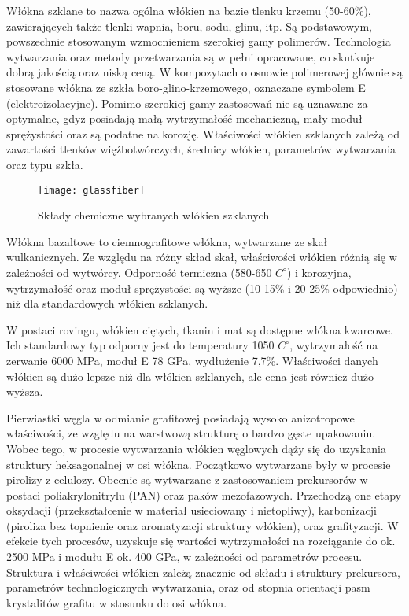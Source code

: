 \documentclass[magister,druk]{dyplom}
\begin{document}
Włókna szklane to nazwa ogólna włókien na bazie tlenku krzemu (50-60\%), zawierających także tlenki wapnia, boru, sodu, glinu, itp. Są podstawowym, powszechnie stosowanym wzmocnieniem szerokiej gamy polimerów. Technologia wytwarzania oraz metody przetwarzania są w pełni opracowane, co skutkuje dobrą jakością oraz niską ceną. W kompozytach o osnowie polimerowej głównie są stosowane włókna ze szkła boro-glino-krzemowego, oznaczane symbolem E (elektroizolacyjne). Pomimo szerokiej gamy zastosowań nie są uznawane za optymalne, gdyż posiadają małą wytrzymałość mechaniczną, mały moduł sprężystości oraz są podatne na korozję. Właściwości włókien szklanych zależą od zawartości tlenków więźbotwórczych, średnicy włókien, parametrów wytwarzania oraz typu szkła.

\begin{figure}[]
	\centering
	\texttt{[image: glassfiber]}
	\caption{Składy chemiczne wybranych włókien szklanych\cite{Chawla1998}}
\end{figure}

Włókna bazaltowe to ciemnografitowe włókna, wytwarzane ze skał wulkanicznych. Ze względu na różny skład skał, właściwości włókien różnią się w zależności od wytwórcy. Odporność termiczna (580-650 ${C^{\circ}}$) i korozyjna, wytrzymałość oraz moduł sprężystości są wyższe (10-15\% i 20-25\% odpowiednio) niż dla standardowych włókien szklanych.

W postaci rovingu, włókien ciętych, tkanin i mat są dostępne włókna kwarcowe. Ich standardowy typ odporny jest do temperatury 1050 ${C^{\circ}}$, wytrzymałość na zerwanie 6000 MPa, moduł E 78 GPa, wydłużenie 7,7\%. Właściwości danych włókien są dużo lepsze niż dla włókien szklanych, ale cena jest również dużo wyższa.

Pierwiastki węgla w odmianie grafitowej posiadają wysoko anizotropowe właściwości, ze względu na warstwową strukturę o bardzo gęste upakowaniu. Wobec tego, w procesie wytwarzania włókien węglowych dąży się do uzyskania struktury heksagonalnej w osi włókna. Początkowo wytwarzane były w procesie pirolizy z celulozy. Obecnie są wytwarzane z zastosowaniem prekursorów w postaci poliakrylonitrylu (PAN) oraz paków mezofazowych. Przechodzą one etapy oksydacji (przekształcenie w materiał usieciowany i nietopliwy), karbonizacji (piroliza bez topnienie oraz aromatyzacji struktury włókien), oraz grafityzacji. W efekcie tych procesów, uzyskuje się wartości wytrzymałości na rozciąganie do ok. 2500 MPa i modułu E ok. 400 GPa, w zależności od parametrów procesu. Struktura i właściwości włókien zależą znacznie od składu i struktury prekursora, parametrów technologicznych wytwarzania, oraz od stopnia orientacji pasm krystalitów grafitu w stosunku do osi włókna.
\end{document}
